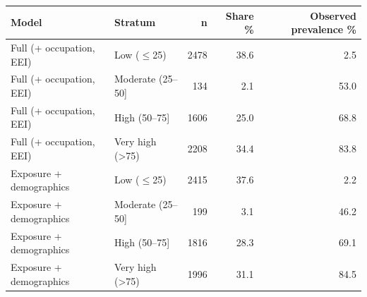 \begin{tabular}{llrrr}
\toprule
Model & Stratum & n & Share \% & Observed prevalence \% \\
\midrule
Full (+ occupation, EEI) & Low ($\leq$25) & 2478 & 38.6 & 2.5 \\
Full (+ occupation, EEI) & Moderate (25--50] & 134 & 2.1 & 53.0 \\
Full (+ occupation, EEI) & High (50--75] & 1606 & 25.0 & 68.8 \\
Full (+ occupation, EEI) & Very high (>75) & 2208 & 34.4 & 83.8 \\
\midrule
Exposure + demographics & Low ($\leq$25) & 2415 & 37.6 & 2.2 \\
Exposure + demographics & Moderate (25--50] & 199 & 3.1 & 46.2 \\
Exposure + demographics & High (50--75] & 1816 & 28.3 & 69.1 \\
Exposure + demographics & Very high (>75) & 1996 & 31.1 & 84.5 \\
\bottomrule
\end{tabular}
